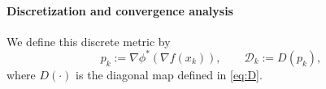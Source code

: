 \documentclass{article}
\theoremstyle{plain}
\theoremstyle{remark}
\begin{document}

\paragraph{Discretization and convergence analysis}

We define this discrete metric by
$$
p_k:=\nabla\phi^*(\nabla f(x_k)),
\qquad
\mathcal D_k:=D(p_k),
$$
where $D(\cdot)$ is the diagonal map defined in \eqref{eq:D}. 
\end{document}
